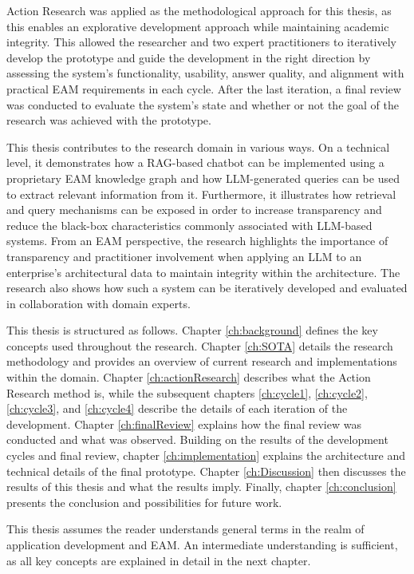 Action Research was applied as the methodological approach for this thesis, as this enables an explorative development approach while maintaining academic integrity. This allowed the researcher and two expert practitioners to iteratively develop the prototype and guide the development in the right direction by assessing the system’s functionality, usability, answer quality, and alignment with practical EAM requirements in each cycle. After the last iteration, a final review was conducted to evaluate the system's state and whether or not the goal of the research was achieved with the prototype.

This thesis contributes to the research domain in various ways. On a technical level, it demonstrates how a RAG-based chatbot can be implemented using a proprietary EAM knowledge graph and how LLM-generated queries can be used to extract relevant information from it. Furthermore, it illustrates how retrieval and query mechanisms can be exposed in order to increase transparency and reduce the black-box characteristics commonly associated with LLM-based systems. From an EAM perspective, the research highlights the importance of transparency and practitioner involvement when applying an LLM to an enterprise's architectural data to maintain integrity within the architecture. The research also shows how such a system can be iteratively developed and evaluated in collaboration with domain experts.

This thesis is structured as follows. Chapter \ref{ch:background} defines the key concepts used throughout the research. Chapter \ref{ch:SOTA} details the research methodology and provides an overview of current research and implementations within the domain. Chapter \ref{ch:actionResearch} describes what the Action Research method is, while the subsequent chapters \ref{ch:cycle1}, \ref{ch:cycle2}, \ref{ch:cycle3}, and \ref{ch:cycle4} describe the details of each iteration of the development. Chapter \ref{ch:finalReview} explains how the final review was conducted and what was observed. Building on the results of the development cycles and final review, chapter \ref{ch:implementation} explains the architecture and technical details of the final prototype. Chapter \ref{ch:Discussion} then discusses the results of this thesis and what the results imply. Finally, chapter \ref{ch:conclusion} presents the conclusion and possibilities for future work.

This thesis assumes the reader understands general terms in the realm of application development and EAM. An intermediate understanding is sufficient, as all key concepts are explained in detail in the next chapter.